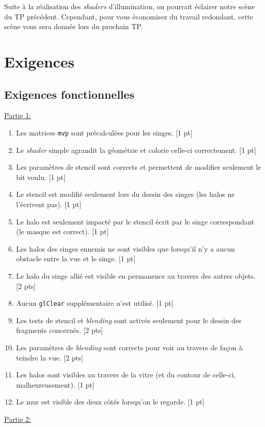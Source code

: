 \documentclass{article}[letterpaper, 11pt]
\begin{document}
Suite à la réalisation des \textit{shaders} d'illumination, on pourrait éclairer notre scène du TP précédent. Cependant, pour vous économisez du travail redondant, cette scène vous sera donnée lors du prochain TP.\@

\newpage
\section{Exigences}
\subsection{Exigences fonctionnelles}
\underline{Partie 1:}
\begin{enumerate}[label={E\arabic*.}]
	\item  Les matrices \texttt{mvp} sont précalculées pour les singes. [1 pt]
	\item Le \textit{shader} simple agrandit la géométrie et colorie celle-ci correctement. [1 pt]
	\item Les paramètres de stencil sont corrects et permettent de modifier seulement le bit voulu. [1 pt]
	\item Le stencil est modifié seulement lors du dessin des singes (les halos ne l'écrivent pas). [1 pt]
	\item Le halo est seulement impacté par le stencil écrit par le singe correspondant (le masque est correct). [1 pt]
	\item Les halos des singes ennemis ne sont visibles que lorsqu'il n'y a aucun obstacle entre la vue et le singe. [1 pt]
	\item Le halo du singe allié est visible en permanence au travers des autres objets. [2 pts]
	\item Aucun \texttt{glClear} supplémentaire n'est utilisé. [1 pt]
	\item Les tests de stencil et \textit{blending} sont activés seulement pour le dessin des fragments concernés. [2 pts]
	\item Les paramètres de \textit{blending} sont corrects pour voir au travers de façon à teindre la vue. [2 pts]
	\item Les halos sont visibles au travers de la vitre (et du contour de celle-ci, malheureusement).
	[1 pt]
	\item Le mur est visible des deux côtés lorsqu'on le regarde. [1 pt]
\end{enumerate}

\underline{Partie 2:}
\end{document}
